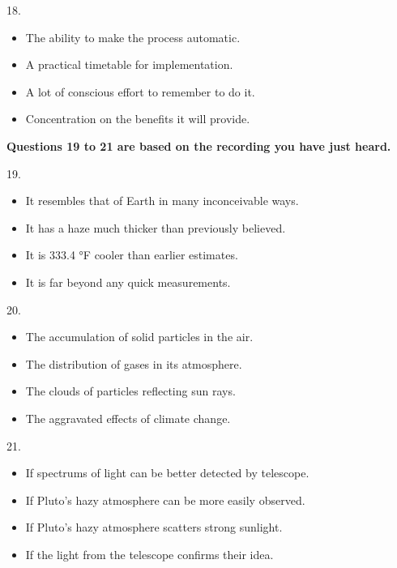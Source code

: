 \documentclass[UTF8,11pt]{ctexart}
\begin{document}
18.


\begin{itemize}[leftmargin=2em,itemsep=.2em,topsep=.4em]\item[A.] The ability to make the process automatic.
\item[B.] A practical timetable for implementation.
\item[C.] A lot of conscious effort to remember to do it.
\item[D.] Concentration on the benefits it will provide.
\end{itemize}

\textbf{Questions 19 to 21 are based on the recording you have just heard.}


19.


\begin{itemize}[leftmargin=2em,itemsep=.2em,topsep=.4em]\item[A.] It resembles that of Earth in many inconceivable ways.
\item[B.] It has a haze much thicker than previously believed.
\item[C.] It is 333.4 °F cooler than earlier estimates.
\item[D.] It is far beyond any quick measurements.
\end{itemize}

20.


\begin{itemize}[leftmargin=2em,itemsep=.2em,topsep=.4em]\item[A.] The accumulation of solid particles in the air.
\item[B.] The distribution of gases in its atmosphere.
\item[C.] The clouds of particles reflecting sun rays.
\item[D.] The aggravated effects of climate change.
\end{itemize}

21.


\begin{itemize}[leftmargin=2em,itemsep=.2em,topsep=.4em]\item[A.] If spectrums of light can be better detected by telescope.
\item[B.] If Pluto’s hazy atmosphere can be more easily observed.
\item[C.] If Pluto’s hazy atmosphere scatters strong sunlight.
\item[D.] If the light from the telescope confirms their idea.
\end{itemize}
\end{document}
